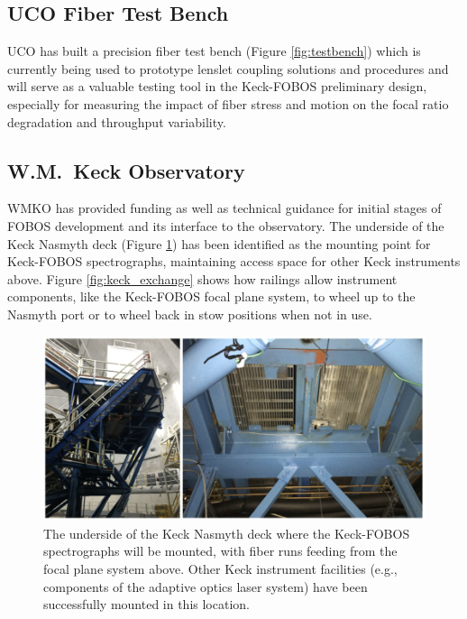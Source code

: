 \documentclass[oneside,11pt]{amsart}
\begin{document}
\subsection{UCO Fiber Test Bench}

UCO has built a precision fiber test bench (Figure \ref{fig:testbench}) which is currently being used to prototype lenslet coupling solutions and procedures and will serve as a valuable testing tool in the Keck-FOBOS preliminary design, especially for measuring the impact of fiber stress and motion on the focal ratio degradation and throughput variability.

\subsection{W.M.\ Keck Observatory}

WMKO has provided funding as well as technical guidance for initial stages of FOBOS development and its interface to the observatory.  The underside of the Keck Nasmyth deck (Figure \ref{fig:nasmyth_mount}) has been identified as the mounting point for Keck-FOBOS spectrographs, maintaining access space for other Keck instruments above.  Figure \ref{fig:keck_exchange} shows how railings allow instrument components, like the Keck-FOBOS focal plane system, to wheel up to the Nasmyth port or to wheel back in stow positions when not in use.


\begin{figure}[h!]
 \vskip -0.1in
 \includegraphics[width=\textwidth]{nasmyth_deck.png}
 \caption{\small The underside of the Keck Nasmyth deck where the Keck-FOBOS spectrographs will be mounted, with fiber runs feeding from the focal plane system above.  Other Keck instrument facilities (e.g., components of the adaptive optics laser system) have been successfully mounted in this location.  }\label{fig:nasmyth_mount}
\end{figure}
\end{document}
